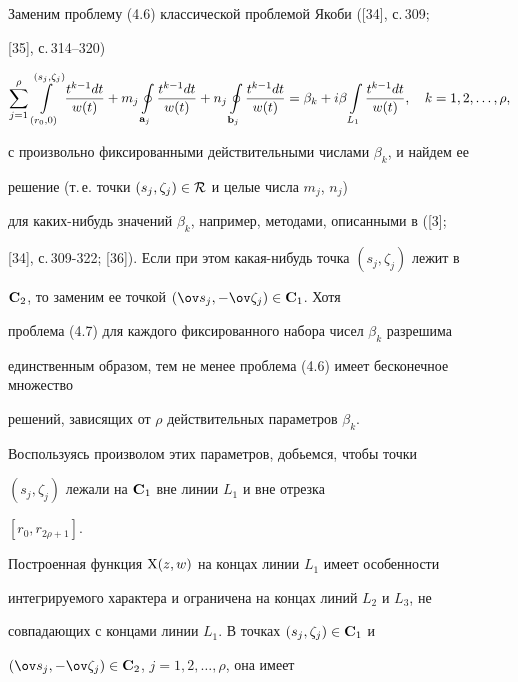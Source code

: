 Заменим проблему (4.6) классической проблемой Якоби ([34], с.\,309; 


[35], с.\,314--320) 


\begin{equation} 


\sum^\rho_{j=1}\int\limits^{(s_j,\zeta_j)}_{(r_0,0)} 


\frac{t^{k-1}dt}{w(t)}+m_j\oint\limits_{\bold a_j} 


\frac{t^{k-1}dt}{w(t)}+n_j\oint\limits_{\bold b_j} 


\frac{t^{k-1}dt}{w(t)}=\beta_k+i\beta\int\limits_{L_1} 


\frac{t^{k-1}dt}{w(t)},\quad k=1,2,\dotsc,\rho, 


\end{equation} 


с произвольно фиксированными действительными числами $\beta_k$, и найдем ее 


решение (т.\,е. точки $(s_j,\zeta_j)\in\cal R$ и целые числа $m_j$, $n_j$) 


для каких-нибудь значений $\beta_k$, например, методами, описанными в ([3]; 


[34], с.\,309-322; [36]). Если при этом какая-нибудь точка $(s_j,\zeta_j)$ лежит в 


$\bold C_2$, то заменим ее точкой $(\ov s_j,-\ov \zeta_j)\in\bold C_1$. Хотя 


проблема (4.7) для каждого фиксированного набора чисел $\beta_k$ разрешима 


единственным образом, тем не менее проблема (4.6) имеет бесконечное множество 


решений, зависящих от $\rho$ действительных параметров $\beta_k$. 


Воспользуясь произволом этих параметров, добьемся, чтобы точки 


$(s_j,\zeta_j)$ лежали на $\bold C_1$ вне линии $L_1$ и вне отрезка 


$[r_0,r_{2\rho+1}]$. 


 


Построенная функция $\mathrm X(z,w)$ на концах линии $L_1$ имеет особенности 


интегрируемого характера и ограничена на концах линий $L_2$ и $L_3$, не 


совпадающих с концами линии $L_1$. В точках $(s_j,\zeta_j)\in\bold C_1$ и 


$(\ov s_j,-\ov\zeta_j)\in\bold C_2$, $j=1,2,\dotsc,\rho$, она имеет 


